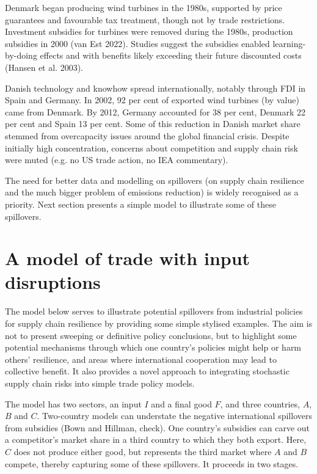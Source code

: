 \documentclass{article}
\begin{document}
Denmark began producing wind turbines in the 1980s, supported by price guarantees and favourable tax treatment, though not by trade restrictions. Investment subsidies for turbines were removed during the 1980s, production subsidies in 2000 (van Est 2022). Studies suggest the subsidies enabled learning-by-doing effects and with benefits likely exceeding their future discounted costs (Hansen et al. 2003).   

Danish technology and knowhow spread internationally, notably through FDI in Spain and Germany. In 2002, 92 per cent of exported wind turbines (by value) came from Denmark. By 2012, Germany accounted for 38 per cent, Denmark 22 per cent and Spain 13 per cent. Some of this reduction in Danish market share stemmed from overcapacity issues around the global financial crisis. Despite initially high concentration, concerns about competition and supply chain risk were muted (e.g. no US trade action, no IEA commentary). 

The need for better data and modelling on spillovers (on supply chain resilience and the much bigger problem of emissions reduction) is widely recognised as a priority. Next section presents a simple model to illustrate some of these spillovers.

\section{A model of trade with input disruptions}

The model below serves to illustrate potential spillovers from industrial policies for supply chain resilience by providing some simple stylised examples. The aim is not to present sweeping or definitive policy conclusions, but to highlight some potential mechanisms through which one country's policies might help or harm others' resilience, and areas where international cooperation may lead to collective benefit. It also provides a novel approach to integrating stochastic supply chain risks into simple trade policy models.

The model has two sectors, an input $I$ and a final good $F$, and three countries, $A$, $B$ and $C$. Two-country models can understate the negative international spillovers from subsidies (Bown and Hillman, check). One country's subsidies can carve out a competitor's market share in a third country to which they both export. Here, $C$ does not produce either good, but represents the third market where $A$ and $B$ compete, thereby capturing some of these spillovers. It proceeds in two stages. 
\end{document}
